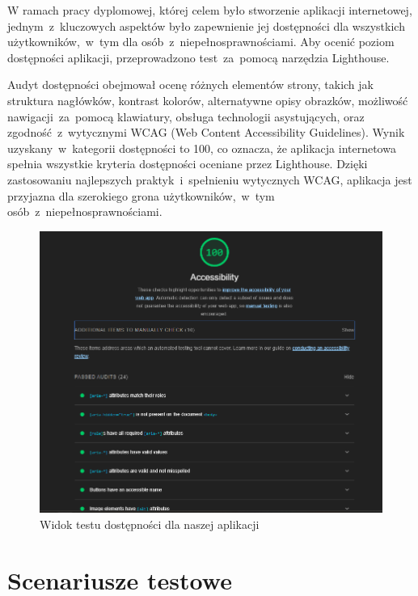 \indent  W ramach pracy dyplomowej, której celem było stworzenie aplikacji internetowej, jednym~z~kluczowych aspektów było zapewnienie jej dostępności 
dla wszystkich użytkowników,~w~tym dla osób~z~niepełnosprawnościami.
 Aby ocenić poziom dostępności aplikacji, przeprowadzono test~za~pomocą narzędzia Lighthouse.

 Audyt dostępności obejmował ocenę różnych elementów strony, takich jak 
 struktura nagłówków, kontrast kolorów, alternatywne opisy obrazków, możliwość nawigacji~za~pomocą klawiatury, 
 obsługa technologii asystujących, oraz zgodność~z~wytycznymi WCAG (Web Content Accessibility Guidelines). \newline
 \indent Wynik uzyskany~w~kategorii dostępności to 100, co oznacza, że aplikacja internetowa spełnia wszystkie kryteria dostępności oceniane przez Lighthouse.
 Dzięki zastosowaniu najlepszych praktyk~i~spełnieniu wytycznych WCAG, aplikacja jest przyjazna dla szerokiego grona użytkowników,~w~tym osób~z~niepełnosprawnościami.
\begin{figure}[H]
    \centering
    \includegraphics[width=1\textwidth]{attachments/testy-dostepnosci}
    \caption{Widok testu dostępności dla naszej aplikacji}
    \label{fig:testy-dostepnosci-zdjecie}
    \end{figure}


\section{Scenariusze testowe}
\label{sec:scenariusze-testowe}

